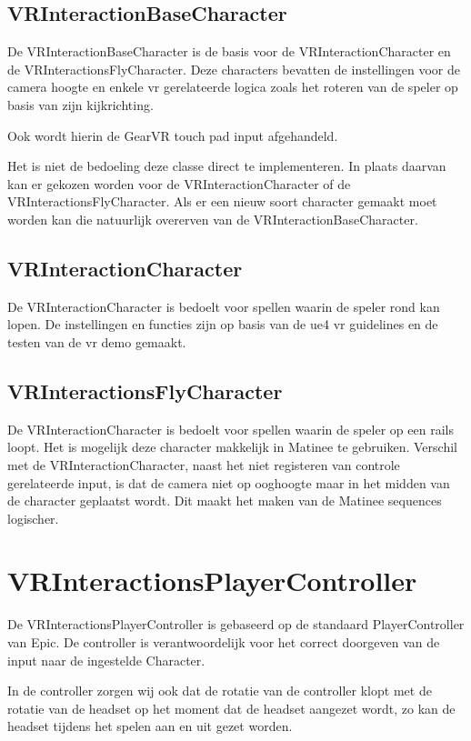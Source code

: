 \subsection{VRInteractionBaseCharacter}
De VRInteractionBaseCharacter is de basis voor de VRInteractionCharacter en de VRInteractionsFlyCharacter. Deze characters bevatten de instellingen voor de camera hoogte en enkele \gls{vr} gerelateerde logica zoals het roteren van de speler op basis van zijn kijkrichting.

Ook wordt hierin de GearVR touch pad input afgehandeld.

Het is niet de bedoeling deze classe direct te implementeren. In plaats daarvan kan er gekozen worden voor de VRInteractionCharacter of de VRInteractionsFlyCharacter. Als er een nieuw soort character gemaakt moet worden kan die natuurlijk overerven van de VRInteractionBaseCharacter.

\subsection{VRInteractionCharacter}
De VRInteractionCharacter is bedoelt voor spellen waarin de speler rond kan lopen. De instellingen en functies zijn op basis van de \gls{ue4} \gls{vr} guidelines en de testen van de \gls{vr} demo gemaakt.

\subsection{VRInteractionsFlyCharacter}
De VRInteractionCharacter is bedoelt voor spellen waarin de speler op een rails loopt. Het is mogelijk deze character makkelijk in Matinee te gebruiken. Verschil met de VRInteractionCharacter, naast het niet registeren van controle gerelateerde input, is dat de camera niet op ooghoogte maar in het midden van de character geplaatst wordt. Dit maakt het maken van de Matinee sequences logischer.

\section{VRInteractionsPlayerController}
De VRInteractionsPlayerController is gebaseerd op de standaard PlayerController van Epic. De controller is verantwoordelijk voor het correct doorgeven van de input naar de ingestelde Character.

In de controller zorgen wij ook dat de rotatie van de controller klopt met de rotatie van de headset op het moment dat de headset aangezet wordt, zo kan de headset tijdens het spelen aan en uit gezet worden.

